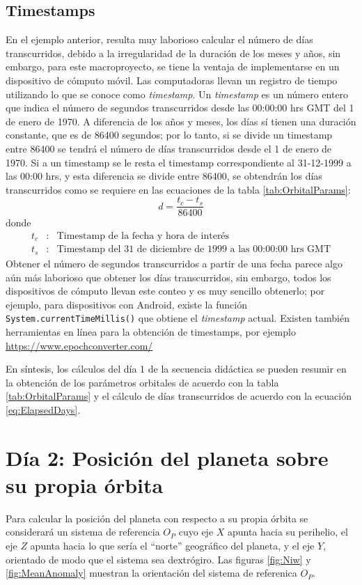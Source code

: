 \documentclass[a4paper,10pt]{article}
\begin{document}
\subsection{Timestamps}
En el ejemplo anterior, resulta muy laborioso calcular el número de días transcurridos, debido a la irregularidad de la duración de los meses y años, sin embargo, para este macroproyecto, se tiene la ventaja de implementarse en un dispositivo de cómputo móvil. Las computadoras llevan un registro de tiempo utilizando lo que se conoce como \textit{timestamp}. Un \textit{timestamp} es un número entero que indica el número de segundos transcurridos desde las 00:00:00 hrs GMT del 1 de enero de 1970. A diferencia de los años y meses, los días sí tienen una duración constante, que es de 86400 segundos; por lo tanto, si se divide un timestamp entre 86400 se tendrá el número de días transcurridos desde el 1 de enero de 1970. Si a un timestamp se le resta el timestamp correspondiente al 31-12-1999 a las 00:00 hrs, y esta diferencia se divide entre 86400, se obtendrán los días transcurridos como se requiere en las ecuaciones de la tabla \ref{tab:OrbitalParams}:
\begin{equation}
  d = \frac{t_c - t_s}{86400}
  \label{eq:ElapsedDays}
\end{equation}
donde
\begin{eqnarray*}
  t_c &:& \textrm{Timestamp de la fecha y hora de interés}\\
  t_s &:& \textrm{Timestamp del 31 de diciembre de 1999 a las 00:00:00 hrs GMT}
\end{eqnarray*}
Obtener el número de segundos transcurridos a partir de una fecha parece algo aún más laborioso que obtener los días transcurridos, sin embargo, todos los dispositivos de cómputo llevan este conteo y es muy sencillo obtenerlo; por ejemplo, para dispositivos con Android, existe la función \texttt{System.currentTimeMillis()} que obtiene el \textit{timestamp} actual. Existen también herramientas en línea para la obtención de timestamps, por ejemplo \url{https://www.epochconverter.com/}

En síntesis, los cálculos del día 1 de la secuencia didáctica se pueden resumir en la obtención de los parámetros orbitales de acuerdo con la tabla \ref{tab:OrbitalParams} y el cálculo de días transcurridos de acuerdo con la ecuación \ref{eq:ElapsedDays}.

\section{Día 2: Posición del planeta sobre su propia órbita}
Para calcular la posición del planeta con respecto a su propia órbita se considerará un sistema de referencia $O_P$ cuyo eje $X$ apunta hacia su perihelio, el eje $Z$ apunta hacia lo que sería el ``norte'' geográfico del planeta, y el eje $Y$, orientado de modo que el sistema sea dextrógiro. Las figuras \ref{fig:Niw} y \ref{fig:MeanAnomaly} muestran la orientación del sistema de referenica $O_P$.
\end{document}
